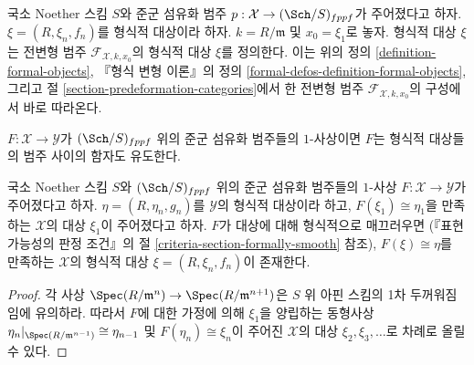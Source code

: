 \begin{remark}
\label{remark-formal-objects-match}
국소 Noether 스킴 $S$와 준군 섬유화 범주
$p : \mathcal{X} \to (\Sch/S)_{fppf}$가 주어졌다고 하자.
$\xi = (R, \xi_n, f_n)$를 형식적 대상이라 하자.
$k = R/\mathfrak m$ 및 $x_0 = \xi_1$로 놓자. 형식적 대상 $\xi$는
전변형 범주 $\mathcal{F}_{\mathcal{X}, k, x_0}$의 형식적 대상
$\xi$를 정의한다. 이는 위의 정의 \ref{definition-formal-objects},
『형식 변형 이론』의 정의
\ref{formal-defos-definition-formal-objects}, 그리고 절
\ref{section-predeformation-categories}에서 한 전변형 범주
$\mathcal{F}_{\mathcal{X}, k, x_0}$의 구성에서 바로 따라온다.
\end{remark}

\noindent
$F : \mathcal{X} \to \mathcal{Y}$가 $(\Sch/S)_{fppf}$ 위의
준군 섬유화 범주들의 $1$-사상이면 $F$는 형식적 대상들의 범주 사이의
함자도 유도한다.

\begin{lemma}
\label{lemma-smooth-lift-formal}
국소 Noether 스킴 $S$와 $(\Sch/S)_{fppf}$ 위의 준군 섬유화 범주들의
$1$-사상 $F : \mathcal{X} \to \mathcal{Y}$가 주어졌다고 하자.
$\eta = (R, \eta_n, g_n)$를 $\mathcal{Y}$의 형식적 대상이라 하고,
$F(\xi_1) \cong \eta_1$을 만족하는 $\mathcal{X}$의 대상 $\xi_1$이
주어졌다고 하자. $F$가 대상에 대해 형식적으로 매끄러우면
(『표현 가능성의 판정 조건』의 절
\ref{criteria-section-formally-smooth} 참조), $F(\xi) \cong \eta$를
만족하는 $\mathcal{X}$의 형식적 대상
$\xi = (R, \xi_n, f_n)$이 존재한다.
\end{lemma}

\begin{proof}
각 사상 $\Spec(R/\mathfrak m^n) \to \Spec(R/\mathfrak m^{n + 1})$은
$S$ 위 아핀 스킴의 1차 두꺼워짐임에 유의하라. 따라서 $F$에 대한
가정에 의해 $\xi_1$을 양립하는 동형사상
$\eta_n|_{\Spec(R/\mathfrak m^{n - 1})} \cong \eta_{n - 1}$
및 $F(\eta_n) \cong \xi_n$이 주어진 $\mathcal{X}$의 대상
$\xi_2, \xi_3, \ldots$로 차례로 올릴 수 있다.
\end{proof}

